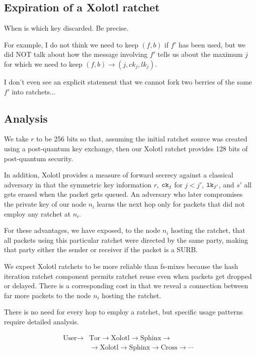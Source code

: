 \documentclass[twoside,letterpaper]{llncs}
\begin{document}
\subsection{Expiration of a Xolotl ratchet}

When is which key discarded.  Be precise.

For example, I do not think we need to keep $(f,b)$ if
$f'$ has been used, but we did NOT talk about
how the message involving $f'$ tells us about
the maximum $j$ for which we need to keep
$(f,b) \to (j,ck_j,lk_j)$.

I don't even see an explicit statement that we
cannot fork two berries of the same $f'$ into ratchets...


\subsection{Analysis}

We take $r$ to be 256 bits so that, assuming the initial ratchet
source was created using a post-quantum key exchange, then our
Xolotl ratchet provides 128 bits of post-quantum security.

In addition, Xolotl provides a measure of forward secrecy against
a classical adversary in that the symmetric key information $r$,
$\texttt{ck}_j$ for $j<j'$, $\texttt{lk}_{j'}$, and $s'$ all gets erased when
the packet gets queued.  An adversary who later compromises the
private key of our node $n_i$ learns the next hop only for packets
that did not employ any ratchet at $n_i$.

For these advantages, we have exposed,
 to the node $n_i$ hosting the ratchet, that all packets using this
particular ratchet were directed by the same party, making that
party either the sender or receiver if the packet is a SURB.

We expect Xolotl ratchets to be more reliable than fs-mixes because
the hash iteration ratchet component permits ratchet reuse even when
packets get dropped or delayed.  There is a corresponding cost in
that we reveal a connection between far more packets to the node
$n_i$ hosting the ratchet.

There is no need for every hop to employ a ratchet, %
but specific usage patterns require detailed analysis.

\[ \begin{aligned}
\textrm{User} \to &\textrm{Tor} \to \textrm{Xolotl} \to \textrm{Sphinx} \to \\
\quad &\to \textrm{Xolotl} \to \textrm{Sphinx} \to \textrm{Cross} \to \cdots 
\end{aligned} \]
\end{document}
